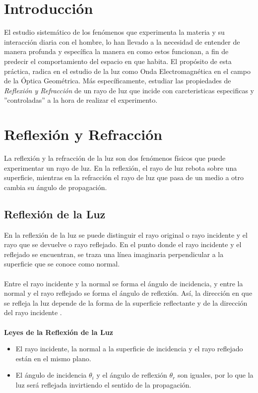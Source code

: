 \documentclass[
aps,
reprint,
amsmath, amssymb,
superscriptaddress,
]{revtex4-2}
\begin{document}
\section{Introducción}
El estudio sistemático de los fenómenos que experimenta la materia y su interacción diaria con el hombre, lo han llevado a la necesidad de entender de manera profunda y específica la manera en como estos funcionan, a fin de predecir el comportamiento del espacio en que habita. El propósito de esta práctica, radica en el estudio de la luz como Onda Electromagnética en el campo de la Óptica Geométrica. Más específicamente, estudiar las propiedades de \textit{Reflexión y Refracción} de un rayo de luz que incide con carcteristicas especificas y ''controladas'' a la hora de realizar el experimento.

\section{Reflexión y Refracción}
La reflexión y la refracción de la luz son dos fenómenos físicos que puede experimentar un rayo de luz. En la reflexión, el rayo de luz rebota sobre una superficie, mientras en la refracción el rayo de luz que pasa de un medio a otro cambia su ángulo de propagación.

\subsection{Reflexión de la Luz}

En la reflexión de la luz se puede distinguir el rayo original o rayo incidente y el rayo que se devuelve o rayo reflejado. En el punto donde el rayo incidente y el reflejado se encuentran, se traza una línea imaginaria perpendicular a la superficie que se conoce como normal.\\
\\
Entre el rayo incidente y la normal se forma el ángulo de incidencia, y entre la normal y el rayo reflejado se forma el ángulo de reflexión. Así, la dirección en que se refleja la luz depende de la forma de la superficie reflectante y de la dirección del rayo incidente \cite{optics}.\\
\\
\textbf{Leyes de la Reflexión de la Luz}

\begin{itemize}
    \item El rayo incidente, la normal a la superficie de incidencia y el rayo reflejado están en el mismo plano.
    
    \item  El ángulo de incidencia $\theta_{i} $ y el ángulo de reflexión $\theta_{r}$ son iguales, por lo que la luz será reflejada invirtiendo el sentido de la propagación.
\end{itemize}
\end{document}

